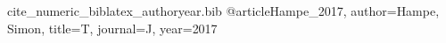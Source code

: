 \begin{filecontents*}{cite_numeric_biblatex_authoryear.bib}
@article{Hampe_2017, author={Hampe, Simon}, title={T}, journal={J}, year={2017}}
\end{filecontents*}
\documentclass{article}
\usepackage[style=authoryear]{biblatex}


A \cite{Hampe_2017}, B \parencite{Hampe_2017}, C \textcite{Hampe_2017}.
\printbibliography

